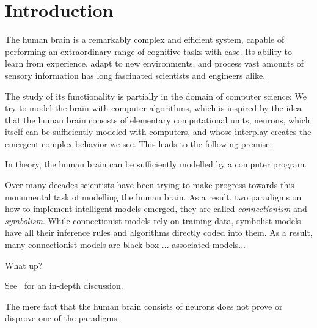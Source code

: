 \documentclass[../../main.tex]{subfiles}
\begin{document}
    \section{Introduction}
    The human brain is a remarkably complex and efficient system, capable of performing an extraordinary range of cognitive tasks with ease. Its ability to learn from experience, adapt to new environments, and process vast amounts of sensory information has long fascinated scientists and engineers alike.

    The study of its functionality is partially in the domain of computer science: We try to model the brain with computer algorithms, which is inspired by the idea that the human brain consists of elementary computational units, neurons, which itself can be sufficiently modeled with computers, and whose interplay creates the emergent complex behavior we see. This leads to the following premise:

    \begin{premise}
        In theory, the human brain can be sufficiently modelled by a computer program.
    \end{premise}

    \bigskip
    Over many decades scientists have been trying to make progress towards this monumental task of modelling the human brain. As a result, two paradigms on how to implement intelligent models emerged, they are called \emph{connectionism} and \emph{symbolism}. While connectionist models rely on training data, symbolist models have all their inference rules and algorithms directly coded into them. As a result, many connectionist models are black box ... associated models...

    \begin{citecallout}
        What up?
    \end{citecallout}
    \begin{critique}
See~\cite{smith2020example} for an in-depth discussion.
\end{critique}



    The mere fact that the human brain consists of neurons does not prove or disprove one of the paradigms.
\end{document}
